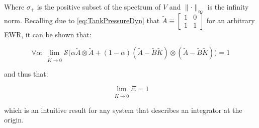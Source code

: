 Where $\sigma_+$ is the positive subset of the spectrum of $V$ and $\lVert \cdot \rVert_\infty$ is the infinity norm. Recalling due to \cref{eq:TankPressureDyn} that $\tilde{A} \equiv \begin{bmatrix} 1 & 0 \\ 1 & 1 \end{bmatrix}$ for an arbitrary EWR, it can be shown that:

\begin{equation}\label{eq:AsymptoticPacketLossTolerance}
	\forall \alpha: \ \lim_{\tilde{K} \to 0} \mathcal{S}\Big(\alpha \tilde{A} \otimes \tilde{A} + (1-\alpha)(\tilde{A}-\tilde{B}\tilde{K}) \otimes (\tilde{A}-\tilde{B}\tilde{K}) \Big) = 1
\end{equation}

and thus that:

\begin{equation}\label{eq:AsymptoticXiBound}
	 \lim_{\tilde{K} \to 0} \Xi = 1
\end{equation}

which is an intuitive result for any system that describes an integrator at the origin.


